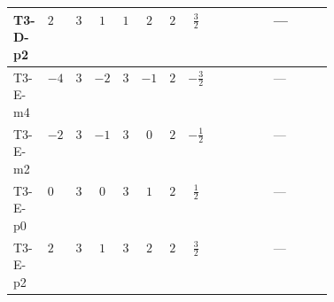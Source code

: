 \documentclass[8pt]{article}
\begin{document}
\begin{landscape}
\begin{longtable}{@{}llcccccc >{\raggedright\arraybackslash}p{0.21\linewidth} >{\raggedright\arraybackslash}p{0.21\linewidth}@{}}
\midrule
T3-D-p2 & $2$ & $3$ & $1$ & $1$ & $2$ & $2$ & $\frac{3}{2}$ & \scriptsize\adjustbox{max width=\linewidth}{$\begin{gathered} -\frac{{g_2}^3}{2}\end{gathered}$} & --- \\
\midrule
T3-E-m4 & $-4$ & $3$ & $-2$ & $3$ & $-1$ & $2$ & $-\frac{3}{2}$ & \scriptsize\adjustbox{max width=\linewidth}{$\begin{gathered} \frac{{g_2}^3}{6}\end{gathered}$} & --- \\
\midrule
T3-E-m2 & $-2$ & $3$ & $-1$ & $3$ & $0$ & $2$ & $-\frac{1}{2}$ & \scriptsize\adjustbox{max width=\linewidth}{$\begin{gathered} \frac{{g_2}^3}{6}\end{gathered}$} & --- \\
\midrule
T3-E-p0 & $0$ & $3$ & $0$ & $3$ & $1$ & $2$ & $\frac{1}{2}$ & \scriptsize\adjustbox{max width=\linewidth}{$\begin{gathered} \frac{{g_2}^3}{6}\end{gathered}$} & --- \\
\midrule
T3-E-p2 & $2$ & $3$ & $1$ & $3$ & $2$ & $2$ & $\frac{3}{2}$ & \scriptsize\adjustbox{max width=\linewidth}{$\begin{gathered} \frac{{g_2}^3}{6}\end{gathered}$} & --- \\
\midrule
\bottomrule
\end{longtable}
\clearpage

\end{landscape}
\end{document}
